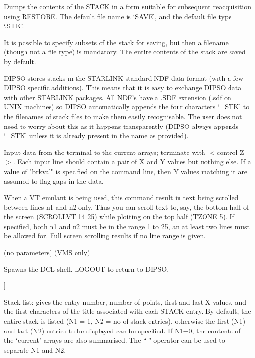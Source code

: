 \begin {description}
Dumps the contents of the STACK in a form suitable for subsequent
reacquisition using RESTORE. The default file name is `SAVE', and the
default file type `.STK'.

It is possible to specify subsets of the stack for saving, but then a
filename (though not a file type) is mandatory. The entire contents of
the stack are saved by default.

DIPSO stores stacks in the STARLINK standard NDF data format (with a
few DIPSO specific additions). This means that it is easy to exchange
DIPSO data with other STARLINK packages. All NDF's have a .SDF
extension (.sdf on UNIX machines) so DIPSO automatically appends the
four characters `\_STK' to the filenames of stack files to make them
easily recognisable. The user does not need to worry about this as it
happens transparently (DIPSO always appends `\_STK' unless it is
already present in the name as provided).


\item [SCREENRD] [brkval]

Input data from the terminal to the current arrays;  terminate with
$<$control-Z$>$. Each input line should contain a pair of X and Y
values but nothing else. If a value of "brkval" is specified on the
command line, then Y values matching it are assumed to flag gaps in
the data.

\item [SCROLLVT] [n1 n2]

When a VT emulant is being used, this command result in text being
scrolled between lines n1 and n2 only. Thus you can scroll text to,
say, the bottom half of the screen (SCROLLVT 14 25) while plotting on
the top half (TZONE 5). If specified, both n1 and n2 must be in the
range 1 to 25, an at least two lines must be allowed for. Full screen
scrolling results if no line range is given.

\item [SHELL] (no parameters)  (VMS only)

Spawns the DCL shell.
LOGOUT to return to DIPSO.

\item [SL] [N1 [N2]]

Stack list: gives the entry number, number of points, first and last X
values, and the first characters of the title associated with each
STACK entry. By default, the entire stack is listed (N1 = 1, N2 = no
of stack entries), otherwise the first (N1) and last (N2) entries to
be displayed can be specified. If N1=0, the contents of the `current'
arrays are also summarised. The ``-" operator can be used to separate
N1 and N2.


\end{description}

